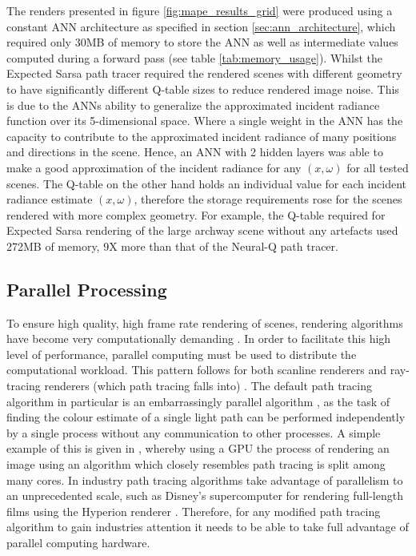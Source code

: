\documentclass[../dissertation.tex]{subfiles}
\begin{document}
The renders presented in figure \ref{fig:mape_results_grid} were produced using a constant ANN architecture as specified in section \ref{sec:ann_architecture}, which required only 30MB of memory to store the ANN as well as intermediate values computed during a forward pass (see table \ref{tab:memory_usage}). Whilst the Expected Sarsa path tracer required the rendered scenes with different geometry to have significantly different Q-table sizes to reduce rendered image noise. This is due to the ANNs ability to generalize the approximated incident radiance function over its 5-dimensional space. Where a single weight in the ANN has the capacity to contribute to the approximated incident radiance of many positions and directions in the scene. Hence, an ANN with 2 hidden layers was able to make a good approximation of the incident radiance for any $(x, \omega)$ for all tested scenes. The Q-table on the other hand holds an individual value for each incident radiance estimate $(x,\omega)$, therefore the storage requirements rose for the scenes rendered with more complex geometry. For example, the Q-table required for Expected Sarsa rendering of the large archway scene without any artefacts used 272MB of memory, 9X more than that of the Neural-Q path tracer.

\subsection{Parallel Processing}

To ensure high quality, high frame rate rendering of scenes, rendering algorithms have become very computationally demanding \cite{crockett1995parallel}. In order to facilitate this high level of performance, parallel computing must be used to distribute the computational workload. This pattern follows for both scanline renderers and ray-tracing renderers (which path tracing falls into) \cite{alerstam2008parallel, fatahalian2009data}. The default path tracing algorithm in particular is an embarrassingly parallel algorithm \cite{embarissingly_parallelizable}, as the task of finding the colour estimate of a single light path can be performed independently by a single process without any communication to other processes. A simple example of this is given in \cite{accelerated_ray_tracing}, whereby using a GPU the process of rendering an image using an algorithm which closely resembles path tracing is split among many cores. In industry path tracing algorithms take advantage of parallelism to an unprecedented scale, such as Disney's supercomputer for rendering full-length films using the Hyperion renderer \cite{hyperion}. Therefore, for any modified path tracing algorithm to gain industries attention it needs to be able to take full advantage of parallel computing hardware.
\end{document}
